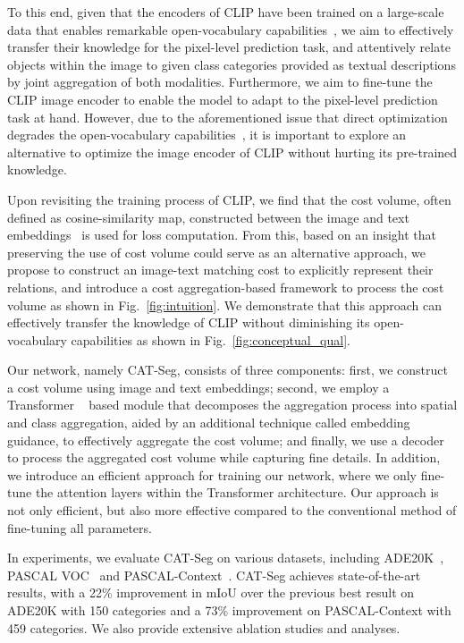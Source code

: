 \documentclass[10pt,twocolumn,letterpaper]{article}
\newcommand{\ours}{CAT-Seg\xspace}
\begin{document}
To this end, given that the encoders of CLIP have been trained on a large-scale data that enables remarkable open-vocabulary capabilities~\cite{li2022language, ghiasi2022scaling, zhou2022extract,xu2022simple,liang2022open,ding2022decoupling}, we aim to effectively transfer their knowledge for the pixel-level prediction task, and attentively relate objects within the image to given class categories provided as textual descriptions by joint aggregation of both modalities. Furthermore, we aim to fine-tune the CLIP image encoder to enable the model to adapt to the pixel-level prediction task at hand.
However, due to the aforementioned issue that direct optimization degrades the open-vocabulary capabilities~\cite{zhou2022extract}, it is important to explore an alternative to optimize the image encoder of CLIP without hurting its pre-trained knowledge. 

Upon revisiting the training process of CLIP, we find that the cost volume, often defined as cosine-similarity map,
constructed between the image and text embeddings~\cite{radford2021learning} is used for loss computation. From this, based on an insight that preserving the use of cost volume could serve as an alternative approach, we propose to construct an image-text matching cost to explicitly represent their relations, and introduce a cost aggregation-based framework to process the cost volume as shown in Fig.~\ref{fig:intuition}. We demonstrate that this approach can effectively transfer the knowledge of CLIP without diminishing its open-vocabulary capabilities as shown in Fig.~\ref{fig:conceptual_qual}. 

Our network, namely \ours, consists of three components: first, we construct a cost volume using image and text embeddings; second, we employ a Transformer ~\cite{vaswani2017attention} based module that decomposes the aggregation process into spatial and class aggregation, aided by an additional technique called embedding guidance, to effectively aggregate the cost volume; and finally, we use a decoder to process the aggregated cost volume while capturing fine details. In addition, we introduce an efficient approach for training our network, where we only fine-tune the attention layers within the Transformer architecture. Our approach is not only efficient, but also more effective compared to the conventional method of fine-tuning all parameters.

In experiments, we evaluate \ours on various datasets, including ADE20K~\cite{zhou2019semantic}, PASCAL VOC~\cite{everingham2009pascal} and PASCAL-Context~\cite{mottaghi2014role}. \ours achieves state-of-the-art results, with a 22\% improvement in mIoU over the previous best result on ADE20K with 150 categories and a 73\% improvement on PASCAL-Context with 459 categories. We also provide extensive ablation studies and analyses.
\end{document}
